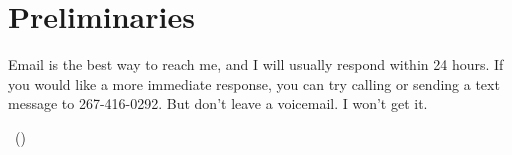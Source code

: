\vspace*{.75cm}
\begin{flushleft}
\textcolor{maroon}{\texttt{\normalsize{\subtitle~~$\cdot$~~\semester\\}}}
\vspace{.75cm}
\vspace{3mm}
\textsf{\mytitle\\
\vspace{5mm}
\normalsize{\myauthor}\\
\myemail\\}
\vspace{1.5mm}
\end{flushleft}
\vspace{15mm}

\section{Preliminaries}

\noindent Email is the best way to reach me, and I will usually respond within 24 hours. If you would like a more immediate response, you can try calling or sending a text message to 267-416-0292. But don’t leave a voicemail. I won’t get it.
 
\vspace{2mm}
\noindent \meeting ~(\myaddress)

